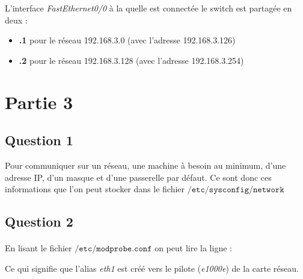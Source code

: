 \documentclass[12pt,a4paper,notitlepage]{article}
\begin{document}
\begin{center}
 \end{center}



L'interface \textit{FastEthernet0/0} à la quelle est connectée le switch est partagée en deux : 
\begin{itemize}
\item \textbf{.1} pour le réseau 192.168.3.0 (avec l'adresse 192.168.3.126)
\item \textbf{.2 }pour le réseau 192.168.3.128 (avec l'adresse 192.168.3.254)
\end{itemize}


\section{Partie 3}
\subsection{Question 1}
Pour communiquer sur un réseau, une machine à besoin au minimum, d'une adresse IP, d'un masque et d'une passerelle par défaut. Ce sont donc ces informations que l'on peut stocker dans le fichier $\mathtt{/etc/sysconfig/network}$

\subsection{Question 2}
\paragraph{}En lisant le fichier $\mathtt{/etc/modprobe.conf}$ on peut lire la ligne :

\begin{center}
 \end{center}

Ce qui signifie que l'alias \textit{eth1} est créé vers le pilote (\textit{e1000e}) de la carte réseau.
\end{document}
